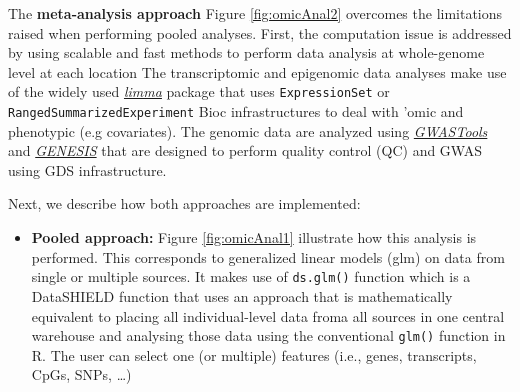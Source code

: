 \documentclass[
]{book}
\providecommand{\tightlist}{%
  \setlength{\itemsep}{0pt}\setlength{\parskip}{0pt}}
\begin{document}
The \textbf{meta-analysis approach} Figure \ref{fig:omicAnal2} overcomes the limitations raised when performing pooled analyses. First, the computation issue is addressed by using scalable and fast methods to perform data analysis at whole-genome level at each location The transcriptomic and epigenomic data analyses make use of the widely used \emph{\href{https://bioconductor.org/packages/3.12/limma}{limma}} package that uses \texttt{ExpressionSet} or \texttt{RangedSummarizedExperiment} Bioc infrastructures to deal with 'omic and phenotypic (e.g covariates). The genomic data are analyzed using \emph{\href{https://bioconductor.org/packages/3.12/GWASTools}{GWASTools}} and \emph{\href{https://bioconductor.org/packages/3.12/GENESIS}{GENESIS}} that are designed to perform quality control (QC) and GWAS using GDS infrastructure.

Next, we describe how both approaches are implemented:

\begin{itemize}
\tightlist
\item
  \textbf{Pooled approach:} Figure \ref{fig:omicAnal1} illustrate how this analysis is performed. This corresponds to generalized linear models (glm) on data from single or multiple sources. It makes use of \texttt{ds.glm()} function which is a DataSHIELD function that uses an approach that is mathematically equivalent to placing all individual-level data froma all sources in one central warehouse and analysing those data using the conventional \texttt{glm()} function in R. The user can select one (or multiple) features (i.e., genes, transcripts, CpGs, SNPs, \ldots)
\end{itemize}
\end{document}
